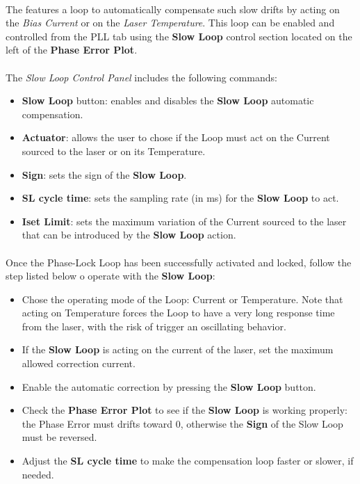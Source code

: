 \paragraph{} The \QubeModel  features a loop to automatically compensate such slow drifts by acting on the \textit{Bias Current} or on the \textit{Laser Temperature}. This loop can be enabled and controlled from the PLL tab using the \textbf{Slow Loop} control section located on the left of the \textbf{Phase Error Plot}.

\paragraph{} The \textit{Slow Loop Control Panel} includes the following commands:

\begin{itemize}
    \item \textbf{Slow Loop} button: enables and disables the \textbf{Slow Loop} automatic compensation.
    \item \textbf{Actuator}: allows the user to chose if the Loop must act on the Current sourced to the laser or on its Temperature.
    \item \textbf{Sign}: sets the sign of the \textbf{Slow Loop}.
    \item \textbf{SL cycle time}: sets the sampling rate (in ms) for the \textbf{Slow Loop} to act.
    \item \textbf{Iset Limit}: sets the maximum variation of the Current sourced to the laser that can be introduced by the \textbf{Slow Loop} action.
\end{itemize}

\paragraph{}Once the Phase-Lock Loop has been successfully activated and locked, follow the step listed below o operate with the \textbf{Slow Loop}:
\begin{itemize}
    \item Chose the operating mode of the Loop: Current or Temperature. Note that acting on Temperature forces the Loop to have a very long response time from the laser, with the risk of trigger an oscillating behavior.
    \item If the \textbf{Slow Loop} is acting on the current of the laser, set the maximum allowed correction current.
    \item Enable the automatic correction by pressing the \textbf{Slow Loop} button.
    \item Check the \textbf{Phase Error Plot} to see if the \textbf{Slow Loop} is working properly: the Phase Error must drifts toward 0, otherwise the \textbf{Sign} of the Slow Loop must be reversed.
    \item Adjust the \textbf{SL cycle time} to make the compensation loop faster or slower, if needed.
\end{itemize}
\fi